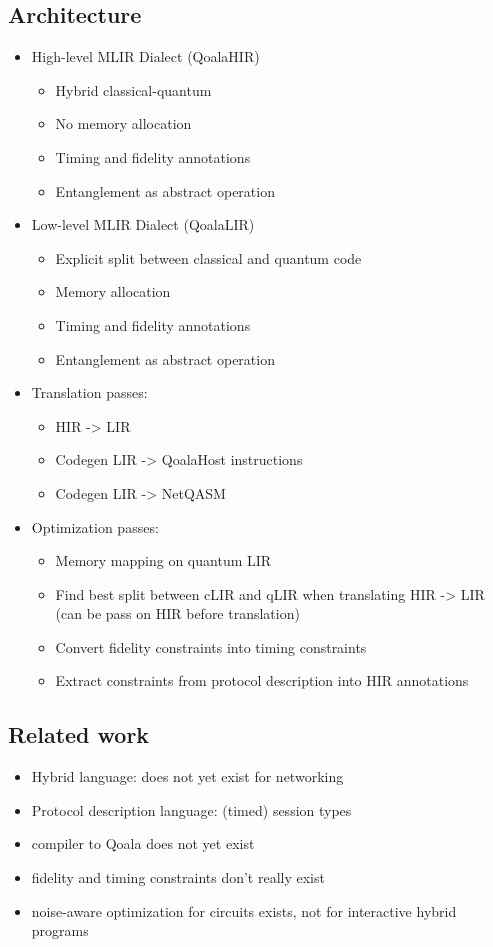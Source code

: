 \subsection{Architecture}


\begin{itemize}
\item High-level MLIR Dialect (QoalaHIR)
    \begin{itemize}
        \item Hybrid classical-quantum
        \item No memory allocation
        \item Timing and fidelity annotations
        \item Entanglement as abstract operation
    \end{itemize}
\item Low-level MLIR Dialect (QoalaLIR)
    \begin{itemize}
        \item Explicit split between classical and quantum code
        \item Memory allocation
        \item Timing and fidelity annotations
        \item Entanglement as abstract operation
    \end{itemize}
\item Translation passes:
    \begin{itemize}
        \item HIR -> LIR
        \item Codegen LIR -> QoalaHost instructions
        \item Codegen LIR -> NetQASM
    \end{itemize}
\item Optimization passes:
    \begin{itemize}
        \item Memory mapping on quantum LIR
        \item Find best split between cLIR and qLIR when translating HIR -> LIR (can be pass on HIR before translation)
        \item Convert fidelity constraints into timing constraints
        \item Extract constraints from protocol description into HIR annotations
    \end{itemize}
\end{itemize}

\subsection{Related work}
\begin{itemize}
    \item Hybrid language: does not yet exist for networking
    \item Protocol description language: (timed) session types
    \item compiler to Qoala does not yet exist
    \item fidelity and timing constraints don't really exist
    \item noise-aware optimization for circuits exists, not for interactive hybrid programs
\end{itemize}



